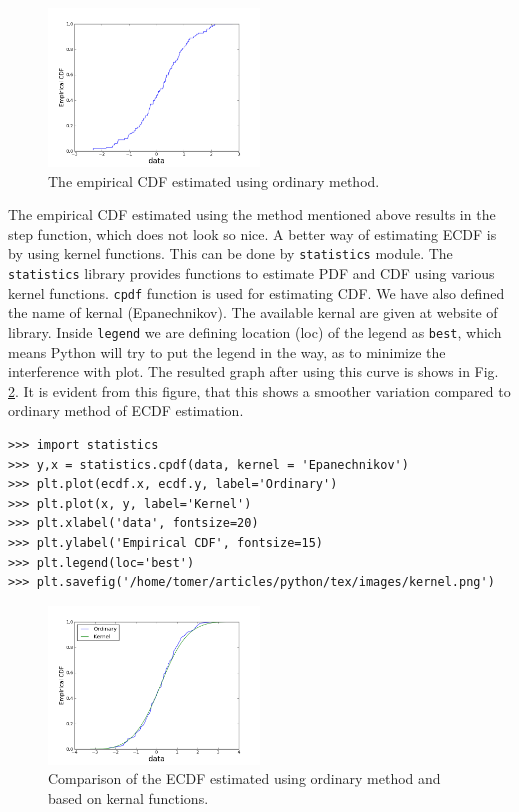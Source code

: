 \documentclass[10pt]{book}
\begin{document}
{\beforefig
\begin{figure}[h!]
  \centering
    \includegraphics[width=0.5\textwidth]{images/ecdf.png}
  \caption{The empirical CDF estimated using ordinary method.}
   \label{fig:ecdf}
\end{figure}
\afterfig
{}
The empirical CDF estimated using the method mentioned above results in the step function, which does not look so nice. A better way of estimating ECDF is by using kernel functions. This can be done by \verb"statistics" module. The \verb"statistics" library provides functions to estimate PDF and CDF using various kernel functions. \verb"cpdf" function is used for estimating CDF. We have also defined the name of kernal (Epanechnikov). The available kernal are given at website of library. Inside \verb"legend" we are defining location (loc) of the legend as \verb"best", which means Python will try to put the legend in the way, as to minimize the interference with plot. The resulted graph after using this curve is shows in Fig. \ref{fig:kernel}. It is evident from this figure, that this shows a smoother variation compared to ordinary method of ECDF estimation. 

\beforeverb
\begin{verbatim}
>>> import statistics
>>> y,x = statistics.cpdf(data, kernel = 'Epanechnikov') 
>>> plt.plot(ecdf.x, ecdf.y, label='Ordinary')
>>> plt.plot(x, y, label='Kernel')
>>> plt.xlabel('data', fontsize=20)
>>> plt.ylabel('Empirical CDF', fontsize=15)
>>> plt.legend(loc='best')
>>> plt.savefig('/home/tomer/articles/python/tex/images/kernel.png')
\end{verbatim}
\afterverb

\beforefig
\begin{figure}[h!]
  \centering
    \includegraphics[width=0.5\textwidth]{images/kernel.png}
  \caption{Comparison of the ECDF estimated using ordinary method and based on kernal functions.}
   \label{fig:kernel}
\end{figure}
\afterfig

}
\end{document}

